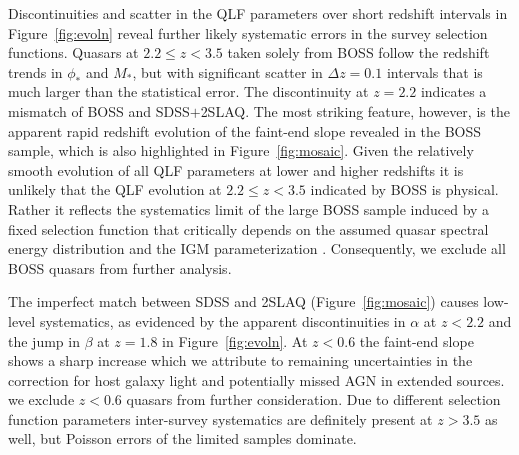 \documentclass[fleqn,usenatbib]{mnras}
\begin{document}

Discontinuities and scatter in the QLF parameters over short redshift
intervals in Figure~\ref{fig:evoln} reveal further likely systematic
errors in the survey selection functions.  Quasars at $2.2\le z<3.5$
taken solely from BOSS \citep{2013ApJ...773...14R} follow the redshift
trends in $\phi_*$ and $M_*$, but with significant scatter in $\Delta
z=0.1$ intervals that is much larger than the statistical error.  The
discontinuity at $z=2.2$ indicates a mismatch of BOSS and
SDSS$+$2SLAQ. The most striking feature, however, is the apparent
rapid redshift evolution of the faint-end slope revealed in the BOSS
sample, which is also highlighted in Figure~\ref{fig:mosaic}. Given
the relatively smooth evolution of all QLF parameters at lower and
higher redshifts it is unlikely that the QLF evolution at $2.2\le
z<3.5$ indicated by BOSS is physical.  Rather it reflects the
systematics limit of the large BOSS sample induced by a fixed
selection function that critically depends on the assumed quasar
spectral energy distribution and the IGM parameterization
\citep{2011ApJ...728...23W,2013ApJ...773...14R}.  Consequently, we
exclude all BOSS quasars from further analysis.

The imperfect match between SDSS and 2SLAQ (Figure~\ref{fig:mosaic})
causes low-level systematics, as evidenced by the apparent
discontinuities in $\alpha$ at $z<2.2$ and the jump in $\beta$ at
$z=1.8$ in Figure~\ref{fig:evoln}.  At $z<0.6$ the faint-end slope
shows a sharp increase which we attribute to remaining uncertainties
in the correction for host galaxy light and potentially missed AGN in
extended sources. we exclude $z<0.6$ quasars from further
consideration. Due to different selection function parameters
inter-survey systematics are definitely present at $z>3.5$ as well,
but Poisson errors of the limited samples dominate.
\end{document}
